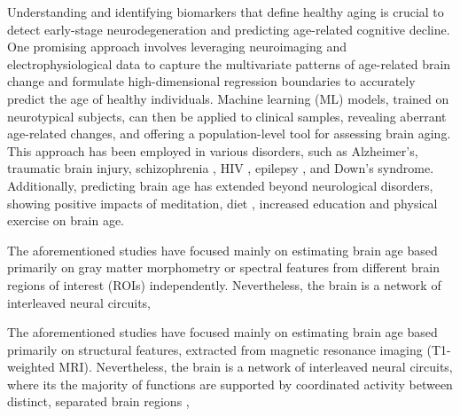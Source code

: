 \documentclass{cys}
\begin{document}
\bigskip
Understanding and identifying biomarkers that define healthy aging is crucial to detect early-stage neurodegeneration and predicting age-related cognitive decline. One promising approach involves leveraging neuroimaging and electrophysiological data to capture the multivariate patterns of age-related brain change and formulate high-dimensional regression boundaries to accurately predict the age of healthy individuals. Machine learning (ML) models, trained on neurotypical subjects, can then be applied to clinical samples, revealing aberrant age-related changes, and offering a population-level tool for assessing brain aging. This approach has been employed in various disorders, such as Alzheimer’s\cite{franke2012longitudinal, gaser2013brainage,gonneaud2020functional, gao2022brain}, traumatic brain injury\cite{cole2015prediction}, schizophrenia \cite{koutsouleris2014accelerated, zhuang1997event}, HIV \cite{kuhn2018augmented, cole2017increased} , epilepsy \cite{pardoe2017structural}, and Down’s syndrome\cite{cole2017brain}. Additionally, predicting brain age has extended beyond neurological disorders, showing positive impacts of meditation\cite{luders2016estimating}, diet \cite{onaolapo2019brain}, increased education and physical exercise \cite{steffener2016differences,vecchio2018neuroprotective}  on brain age. 

\bigskip
The aforementioned studies have focused mainly on estimating brain age based primarily on gray matter morphometry or spectral features from different brain regions of interest (ROIs) independently. Nevertheless, the brain is a network of interleaved neural circuits, 

\bigskip
The aforementioned studies have focused mainly on estimating brain age based primarily on structural features, extracted from magnetic resonance imaging (T1-weighted MRI). Nevertheless, the brain is a network of interleaved neural circuits, where its the majority of functions are supported by coordinated activity between distinct, separated brain regions \cite{sala2015reorganization}, %
\end{document}
